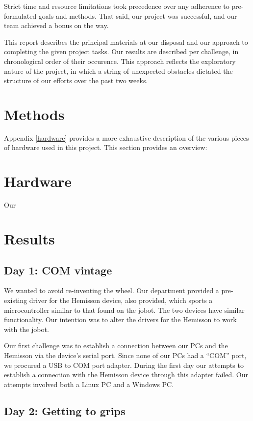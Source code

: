 \documentclass[a4paper, 12pt, titlepage]{article}
\begin{document}
Strict time and resource limitations took precedence over any adherence
to pre-formulated goals and methods. That said, our project was successful,
and our team achieved a bonus on the way.

This report describes the principal materials at our disposal and our approach
to completing the given project tasks. Our results are described per
challenge, in chronological order of their occurence. 
This approach reflects the exploratory
nature of the project, in which a string of unexpected obstacles dictated 
the structure of our efforts over the past two weeks. 

\section{Methods}

Appendix \ref{hardware} provides a more exhaustive description of the various
pieces of hardware used in this project. This section provides an overview:

\section{Hardware}
Our 

\section{Results}
\subsection{Day 1: COM vintage} %

We wanted to avoid re-inventing the wheel. Our department provided a
pre-existing driver for the Hemisson device, also provided, which sports a
microcontroller similar to that found on the jobot. The two devices have similar
functionality. Our intention was to alter the drivers for the Hemisson to work
with the jobot.

Our first challenge was to establish a connection between our PCs and the
Hemisson via the device's serial port. Since none of our PCs had a ``COM'' port,
we procured a USB to COM port adapter. During the first day our attempts to
establish a connection with the Hemisson device through this adapter failed. Our
attempts involved both a Linux PC and a Windows PC.


\subsection{Day 2: Getting to grips} %
\end{document}
